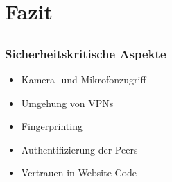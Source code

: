 \documentclass[12pt]{beamer}
\begin{document}
\section{Fazit}
\subsection{}

\begin{frame}[label=supplemental]
  \frametitle{Sicherheitskritische Aspekte}
  \begin{itemize}
    \item Kamera- und Mikrofonzugriff
    \item Umgehung von VPNs
    \item Fingerprinting
    \item Authentifizierung der Peers
    \item Vertrauen in Website-Code
  \end{itemize}
\end{frame}
\end{document}
